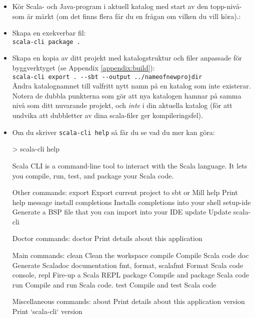 \begin{itemize}
\item Kör Scala- och Java-program i aktuell katalog med start av den topp-nivå- som är märkt  (om det finns flera får du en frågan om vilken  du vill köra).:\\

\item Skapa en exekverbar fil:\\
\texttt{scala-cli package .}

\item Skapa en kopia av ditt projekt med katalogstruktur och filer anpassade för byggverktyget  (se Appendix \ref{appendix:build}):\\
\verb|scala-cli export . --sbt --output ../nameofnewprojdir|\\
Ändra katalognamnet  till valfritt nytt namn på en katalog som inte existerar. Notera de dubbla punkterna som gör att nya katalogen hamnar på samma nivå som ditt nuvarande projekt, och \emph{inte} i din aktuella katalog (för att undvika att dubbletter av dina scala-filer ger kompileringsfel).

\item Om du skriver \texttt{scala-cli help} så får du se vad du mer kan göra:

\begin{REPLsmall}
> scala-cli help

Scala CLI is a command-line tool to interact with the Scala language.
It lets you compile, run, test, and package your Scala code.

Other commands:
  export                 Export current project to sbt or Mill
  help                   Print help message
  install completions    Installs completions into your shell
  setup-ide              Generate a BSP file that you can import into your IDE
  update                 Update scala-cli

Doctor commands:
  doctor  Print details about this application

Main commands:
  clean                  Clean the workspace
  compile                Compile Scala code
  doc                    Generate Scaladoc documentation
  fmt, format, scalafmt  Format Scala code
  console, repl          Fire-up a Scala REPL
  package                Compile and package Scala code
  run                    Compile and run Scala code.
  test                   Compile and test Scala code

Miscellaneous commands:
  about    Print details about this application
  version  Print `scala-cli` version


\end{REPLsmall}
\end{itemize}
